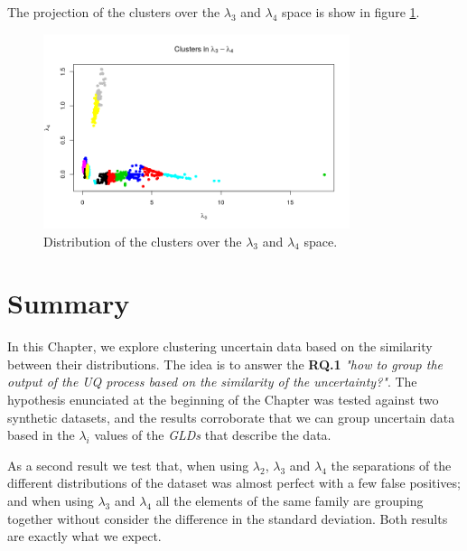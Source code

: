 The projection of the clusters over the $\lambda_{3}$ and $\lambda_{4}$ space is show in figure \ref{fig:dataset2_l3l4_l3_l4}.

\begin{figure}[H]
    \centering
    \includegraphics[width=0.8\textwidth]{img/gld_clustering/Dataset2/nuevo/l3_l4/l3_l4.png}
    \caption{Distribution of the clusters over the $\lambda_{3}$ and $\lambda_{4}$ space.}
    \label{fig:dataset2_l3l4_l3_l4}
\end{figure}


\section{Summary}\label{sec:clustering_summary}

In this Chapter, we explore clustering uncertain data based on the similarity between their distributions. The idea is to answer the \textbf{RQ.1} \textit{"how to group the output of the UQ process based on the similarity of the uncertainty?"}. The hypothesis enunciated at the beginning of the Chapter was tested against two synthetic datasets, and the results corroborate that we can group uncertain data based in the $\lambda_{i}$ values of the \textit{GLDs} that describe the data.

As a second result we test that, when using $\lambda_{2}$, $\lambda_{3}$ and $\lambda_{4}$ the separations of the different distributions of the dataset was almost perfect with a few false positives; and when using $\lambda_{3}$ and $\lambda_{4}$ all the elements of the same family are grouping together without consider the difference in the standard deviation. Both results are exactly what we expect.

